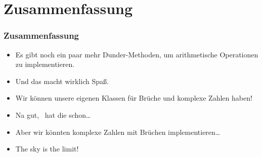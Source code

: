 \documentclass[aspectratio=169,mathserif,notheorems]{beamer}%
\begin{document}
\section{Zusammenfassung}%
%
\begin{frame}[t]%
\frametitle{Zusammenfassung}%
%
\begin{itemize}%
\item Es gibt noch ein paar mehr Dunder-Methoden, um arithmetische Operationen zu implementieren.%
%
\item<2-> Und das macht wirklich Spaß.%
%
\item<3-> Wir können unsere eigenen Klassen für Brüche und komplexe Zahlen haben!%
%
\item<4-> Na gut, \python\ hat die schon\dots%
%
\item<5-> Aber wir könnten komplexe Zahlen mit Brüchen implementieren\dots%
%
\item<6-> The sky is the limit!%
\end{itemize}%
\end{frame}%
%
\endPresentation%
\end{document}
